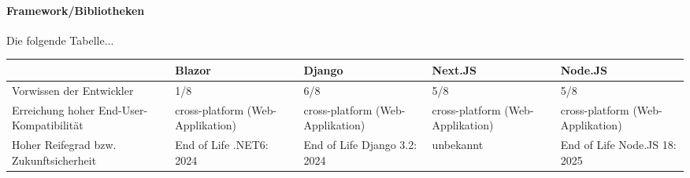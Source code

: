 \paragraph*{Framework/Bibliotheken}

Die folgende Tabelle...\\

\begin{tabular} {|m{3cm}|m{3cm}|m{3cm}|m{3cm}|m{3cm}|}
\hline
 & Blazor & Django & Next.JS & Node.JS \\
\hline
Vorwissen der Entwickler & 1/8 & 6/8 & 5/8 & 5/8 \\
\hline
Erreichung hoher End-User-Kompatibilität & cross-platform (Web-Applikation) & cross-platform (Web-Applikation) & cross-platform (Web-Applikation) & cross-platform (Web-Applikation) \\
\hline
Hoher Reifegrad bzw. Zukunftsicherheit & End of Life .NET6: 2024 & End of Life Django 3.2: 2024 & unbekannt & End of Life Node.JS 18: 2025 \\
\hline
\end{tabular}
